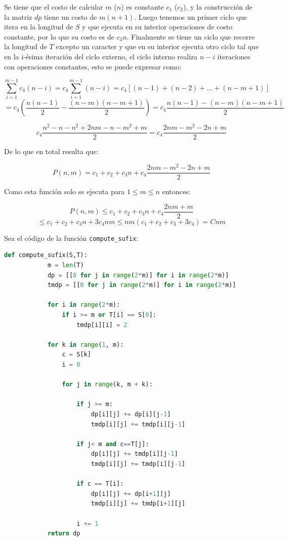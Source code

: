 \documentclass[a4paper]{article}
\begin{document}
    Se tiene que el costo de calcular $m$ ($n$) es constante $c_1$ ($c_2$), y la construcci\'on de la matriz $dp$ tiene un costo de 
    $m(n+1)$. Luego tenemos un primer ciclo que itera en la longitud de $S$ y que ejecuta en su interior operaciones de 
    costo constante, por lo que su costo es de $c_3n$. Finalmente se tiene un ciclo que recorre la longitud de $T$ excepto un caracter y que 
    en su interior ejecuta otro ciclo tal que en la i-\'esima iteraci\'on del ciclo externo, el ciclo interno realiza $n-i$ iteraciones con operaciones constantes, esto se puede expresar como:

    $$\sum_{i=1}^{m-1} c_4(n-i) = c_4\sum_{i=1}^{m-1} (n-i) = c_4 [ (n-1) + (n-2) + ... + (n-m +1)] $$ 
    $$ = c_4 \left( \frac{n(n-1)}{2} - \frac{(n-m)(n-m+1)}{2} \right) = c_4 \frac{n(n-1) - (n-m)(n-m+1)}{2} $$

    $$ c_4\frac{n^2 - n - n^2 + 2nm - n - m^2 + m}{2} = c_4 \frac{2nm - m^2 - 2n + m}{2}$$
            
    De lo que en total resulta que:

    $$P(n,m) = c_1 + c_2 + c_3n + c_4 \frac{2nm - m^2 - 2n + m}{2}$$

    Como esta funci\'on solo se ejecuta para $ 1 \leq m\leq n $ entonces:

    $$P(n,m) \leq c_1 + c_2 + c_3n + c_4 \frac{2nm + m}{2}$$
     $$ \leq c_1 + c_2 + c_3n + 3c_4nm \leq nm(c_1 + c_2 + c_3+ 3c_4) = Cnm$$

    Sea el c\'odigo de la funci\'on \texttt{compute\_sufix}: 

    \begin{lstlisting}[language=Python]
        def compute_sufix(S,T):
            m = len(T)
            dp = [[0 for j in range(2*m)] for i in range(2*m)]
            tmdp = [[0 for j in range(2*m)] for i in range(2*m)]
                    
            for i in range(2*m):
                if i >= m or T[i] == S[0]:
                    tmdp[i][i] = 2
                
            for k in range(1, m):    
                c = S[k]
                i = 0        
            
                for j in range(k, m + k):

                    if j >= m:
                        dp[i][j] += dp[i][j-1]
                        tmdp[i][j] += tmdp[i][j-1]          
                
                    if j< m and c==T[j]:
                        dp[i][j] += tmdp[i][j-1]
                        tmdp[i][j] += tmdp[i][j-1]
                
                    if c == T[i]:
                        dp[i][j] += dp[i+1][j]
                        tmdp[i][j] += tmdp[i+1][j]

                    i += 1  
            return dp  
    \end{lstlisting}
\end{document}
